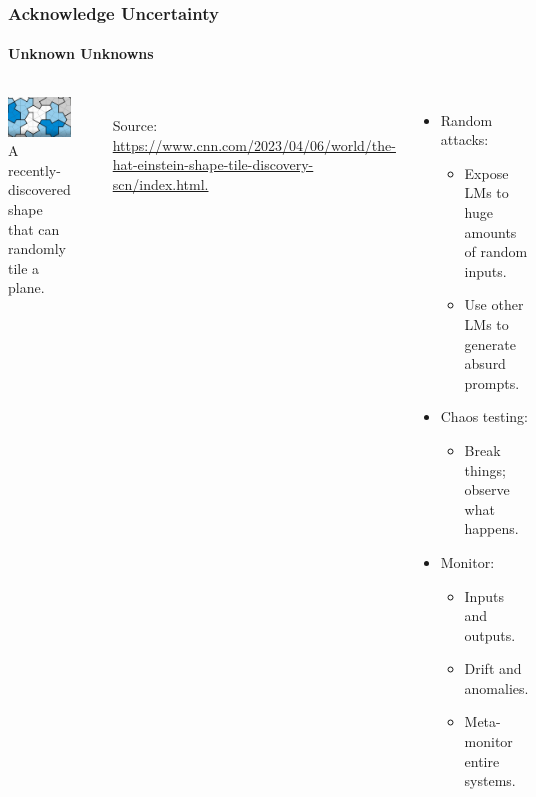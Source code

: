\documentclass[11pt,
               aspectratio=169,
               hyperref={colorlinks}
               ]{beamer}
\begin{document}
		\begin{frame}
			
			\frametitle{Acknowledge Uncertainty}
			\framesubtitle{Unknown Unknowns}
			
			\begin{columns}
				\centering
				\newline
				\includegraphics[width=\textwidth]{../img/uncertainty.jpg} 
				\newline
				\tiny{A recently-discovered shape that can randomly tile a plane.}
				
				\par\noindent\rule{100pt}{0.4pt}\\
				\vspace{5pt}
				\scriptsize{\tiny{Source: \url{https://www.cnn.com/2023/04/06/world/the-hat-einstein-shape-tile-discovery-scn/index.html.}}}

				\begin{itemize}
					\item Random attacks:
						\begin{itemize}
							\item Expose LMs to huge amounts of random inputs.
							\item Use other LMs to generate absurd prompts.
						\end{itemize}
					\item Chaos testing:
						\begin{itemize}
							\item Break things; observe what happens.
						\end{itemize}
					\item Monitor:
						\begin{itemize}
							\item Inputs and outputs.
							\item Drift and anomalies.
							\item Meta-monitor entire systems.
						\end{itemize}
				\end{itemize}
			\end{columns}
					
		\end{frame}
\end{document}
